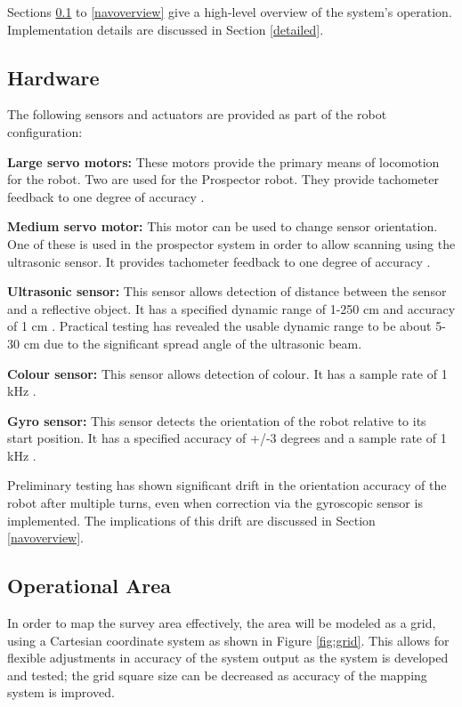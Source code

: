 \documentclass[12pt]{article}
\begin{document}
Sections \ref{hardware} to \ref{navoverview} give a high-level overview of the system's operation. Implementation details are discussed in Section \ref{detailed}.

\subsection{Hardware}\label{hardware}

The following sensors and actuators are provided as part of the robot configuration:

\begin{description}
\item{\textbf{Large servo motors: }} These motors provide the primary means of locomotion for the robot. Two are used for the Prospector robot. They provide tachometer feedback to one degree of accuracy \cite{largemotor}.
\item{\textbf{Medium servo motor: }} This motor can be used to change sensor orientation. One of these is used in the prospector system in order to allow scanning using the ultrasonic sensor. It provides tachometer feedback to one degree of accuracy \cite{mediummotor}.
\item{\textbf{Ultrasonic sensor: }} This sensor allows detection of distance between the sensor and a reflective object. It has a specified dynamic range of 1-250 cm and accuracy of 1 cm \cite{ultrasonic}. Practical testing has revealed the usable dynamic range to be about 5-30 cm due to the significant spread angle of the ultrasonic beam.
\item{\textbf{Colour sensor: }} This sensor allows detection of colour. It has a sample rate of 1 kHz \cite{colour}.
\item{\textbf{Gyro sensor: }} This sensor detects the orientation of the robot relative to its start position. It has a specified accuracy of +/-3 degrees and a sample rate of 1 kHz \cite{gyro}.
\end{description}

Preliminary testing has shown significant drift in the orientation accuracy of the robot after multiple turns, even when correction via the gyroscopic sensor is implemented. The implications of this drift are discussed in Section \ref{navoverview}.

\subsection{Operational Area}
In order to map the survey area effectively, the area will be modeled as a grid, using a Cartesian coordinate system as shown in Figure \ref{fig:grid}. This allows for flexible adjustments in accuracy of the system output as the system is developed and tested; the grid square size can be decreased as accuracy of the mapping system is improved. 
\end{document}
